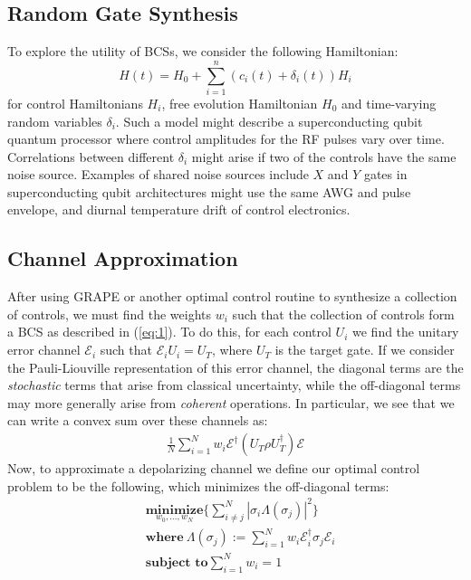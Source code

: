 \documentclass[aps,nofootinbib,pra,notitlepage,twocolumn]{revtex4-1}
\begin{document}
\subsection{Random Gate Synthesis}
To explore the utility of BCSs, we consider the following Hamiltonian:
\begin{equation}\label{eq:2}
  H(t) = H_0 + \sum_{i=1}^n (c_i(t) + \delta_i(t))H_i
\end{equation}
for control Hamiltonians $H_i$, free evolution Hamiltonian $H_0$ and time-varying random variables $\delta_i$. Such a model might describe a superconducting qubit quantum processor where control amplitudes for the RF pulses vary over time. Correlations between different $\delta_i$ might arise if two of the controls have the same noise source. Examples of shared noise sources include $X$ and $Y$ gates in superconducting qubit architectures might use the same AWG and pulse envelope, and diurnal temperature drift of control electronics.
\subsection{Channel Approximation}
After using GRAPE or another optimal control routine to synthesize a collection of controls, we must find the weights $w_i$ such that the collection of controls form a BCS as described in (\ref{eq:1}). To do this, for each control $U_i$ we find the unitary error channel $\mathcal{E}_i$ such that $\mathcal{E}_iU_i=U_T$, where $U_T$ is the target gate. If we consider the Pauli-Liouville representation of this error channel, the diagonal terms are the \textit{stochastic} terms that arise from classical uncertainty, while the off-diagonal terms may more generally arise from \textit{coherent} operations. In particular, we see that we can write a convex sum over these channels as:
\begin{align}
 \frac{1}{N} \sum^N_{i=1} w_i \mathcal{E}^{\dagger} (U_T\rho U_T^{\dagger}) \mathcal{E}
\end{align}
Now, to approximate a depolarizing channel we define our optimal control problem to be the following, which minimizes the off-diagonal terms:
\begin{equation}\label{eq:minimization}
  \begin{split}
    &\underset{w_0, ..., w_N}{\textbf{minimize}} \{\sum_{i\neq j}^N|\sigma_i\Lambda(\sigma_j)|^2\}\\
    &\textbf{where}\ \Lambda(\sigma_j) := \sum^N_{i=1}w_i\mathcal{E}_i^{\dagger}\sigma_j\mathcal{E}_i\\
    &\textbf{subject to} \sum_{i=1}^Nw_i = 1
  \end{split}
\end{equation}
\end{document}
